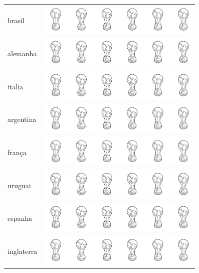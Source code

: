 \begin{longtable}[]{@{}ll@{}}
\toprule
brasil &
\includegraphics[width=3.05575in,height=0.58176in]{media/image105.png}\tabularnewline
alemanha &
\includegraphics[width=3.05575in,height=0.58176in]{media/image105.png}\tabularnewline
italia &
\includegraphics[width=3.05575in,height=0.58176in]{media/image105.png}\tabularnewline
argentina &
\includegraphics[width=3.05575in,height=0.58176in]{media/image105.png}\tabularnewline
frança &
\includegraphics[width=3.05575in,height=0.58176in]{media/image105.png}\tabularnewline
uruguai &
\includegraphics[width=3.05575in,height=0.58176in]{media/image105.png}\tabularnewline
espanha &
\includegraphics[width=3.05575in,height=0.58176in]{media/image105.png}\tabularnewline
inglaterra &
\includegraphics[width=3.05575in,height=0.58176in]{media/image105.png}\tabularnewline
\bottomrule
\end{longtable}


